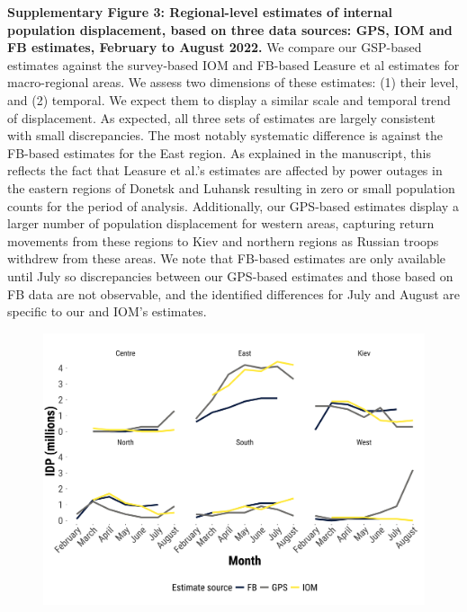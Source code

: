 \documentclass[
  11pt,
]{article}
\begin{document}
\newpage

\textbf{Supplementary Figure 3: Regional-level estimates of internal
population displacement, based on three data sources: GPS, IOM and FB
estimates, February to August 2022.} We compare our GSP-based estimates
against the survey-based IOM and FB-based Leasure et al estimates for
macro-regional areas. We assess two dimensions of these estimates: (1)
their level, and (2) temporal. We expect them to display a similar scale
and temporal trend of displacement. As expected, all three sets of
estimates are largely consistent with small discrepancies. The most
notably systematic difference is against the FB-based estimates for the
East region. As explained in the manuscript, this reflects the fact that
Leasure et al.'s estimates are affected by power outages in the eastern
regions of Donetsk and Luhansk resulting in zero or small population
counts for the period of analysis. Additionally, our GPS-based estimates
display a larger number of population displacement for western areas,
capturing return movements from these regions to Kiev and northern
regions as Russian troops withdrew from these areas. We note that
FB-based estimates are only available until July so discrepancies
between our GPS-based estimates and those based on FB data are not
observable, and the identified differences for July and August are
specific to our and IOM's estimates.

\begin{figure}[h]

\begin{minipage}{\linewidth}

\begin{center}
\includegraphics[width=5.20833in,height=\textheight,keepaspectratio]{../outputs/sm/plot_macro_region.png}
\end{center}

\end{minipage}%

\end{figure}%
\end{document}
